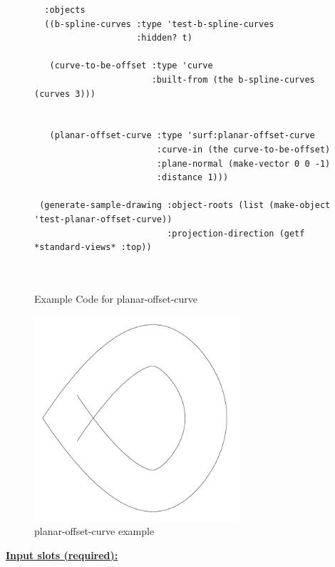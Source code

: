 \documentclass [11pt]{book}
\begin{document}
\begin{itemize}
\begin{figure}
\begin{lrbox}{\boxedverb}
\begin{minipage}{\linewidth}
{\begin{verbatim}
  :objects
  ((b-spline-curves :type 'test-b-spline-curves
                    :hidden? t)
   
   (curve-to-be-offset :type 'curve
                       :built-from (the b-spline-curves (curves 3)))
   
   
   (planar-offset-curve :type 'surf:planar-offset-curve
                        :curve-in (the curve-to-be-offset)
                        :plane-normal (make-vector 0 0 -1)
                        :distance 1)))

 (generate-sample-drawing :object-roots (list (make-object 'test-planar-offset-curve))
                          :projection-direction (getf *standard-views* :top))

 
\end{verbatim}}
\end{minipage}
\end{lrbox}
\fbox{\usebox{\boxedverb}}

\caption{Example Code for planar-offset-curve}

\label{fig:example-code-planar-offset-curve}

\end{figure}

\begin{figure}
\begin{center}
\includegraphics[width=3in,height=3in]{../images/example-planar-offset-curve.pdf}
\end{center}

\caption{planar-offset-curve example}

\label{fig:planar-offset-curve}

\end{figure}





\textbf{
\underline{Input slots (required):}}


\end{itemize}
\end{document}

